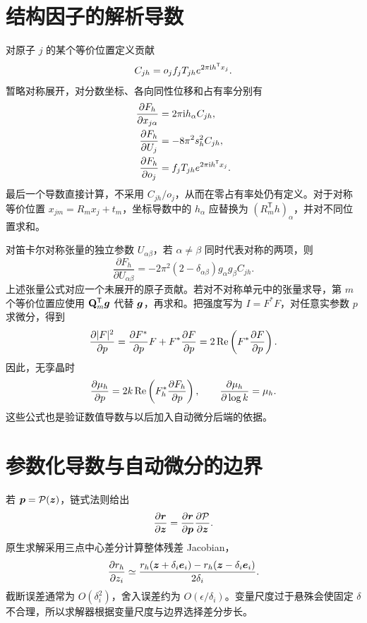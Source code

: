 \section{结构因子的解析导数}
对原子 $j$ 的某个等价位置定义贡献
\begin{equation}
C_{jh}=o_jf_jT_{jh}e^{2\pi\mathrm{i} h^{\mathsf T}x_j}.
\end{equation}
暂略对称展开，对分数坐标、各向同性位移和占有率分别有
\begin{align}
\frac{\partial F_h}{\partial x_{j\alpha}}&=2\pi\mathrm{i} h_\alpha C_{jh},\\
\frac{\partial F_h}{\partial U_j}&=-8\pi^2s_h^2C_{jh},\\
\frac{\partial F_h}{\partial o_j}&=f_jT_{jh}e^{2\pi\mathrm{i} h^{\mathsf T}x_j}.
\end{align}
最后一个导数直接计算，不采用 $C_{jh}/o_j$，从而在零占有率处仍有定义。对于对称等价位置 $x_{jm}=R_mx_j+t_m$，坐标导数中的 $h_\alpha$ 应替换为 $(R_m^{\mathsf T}h)_\alpha$，并对不同位置求和。

对笛卡尔对称张量的独立参数 $U_{\alpha\beta}$，若 $\alpha\ne\beta$ 同时代表对称的两项，则
\begin{equation}
\frac{\partial F_h}{\partial U_{\alpha\beta}}
=-2\pi^2(2-\delta_{\alpha\beta})g_\alpha g_\beta C_{jh}.
\end{equation}
上述张量公式对应一个未展开的原子贡献。若对不对称单元中的张量求导，第 $m$ 个等价位置应使用 $\mathbf{Q}_m^{\mathsf T}\bm{g}$ 代替 $\bm{g}$，再求和。把强度写为 $I=F^*F$，对任意实参数 $p$ 求微分，得到
\begin{equation}
\frac{\partial|F|^2}{\partial p}
=\frac{\partial F^*}{\partial p}F+F^*\frac{\partial F}{\partial p}
=2\operatorname{Re}\left(F^*\frac{\partial F}{\partial p}\right).
\label{eq:derivativeI}
\end{equation}
因此，无孪晶时
\begin{equation}
\frac{\partial\mu_h}{\partial p}
=2k\operatorname{Re}\left(F_h^*\frac{\partial F_h}{\partial p}\right),
\qquad
\frac{\partial\mu_h}{\partial\log k}=\mu_h.
\end{equation}
这些公式也是验证数值导数与以后加入自动微分后端的依据。

\section{参数化导数与自动微分的边界}
若 $\bm{p}=\mathcal P(\bm{z})$，链式法则给出
\begin{equation}
\frac{\partial\bm{r}}{\partial\bm{z}}
=\frac{\partial\bm{r}}{\partial\bm{p}}
\frac{\partial\mathcal P}{\partial\bm{z}}.
\end{equation}
原生求解采用三点中心差分计算整体残差 Jacobian，
\begin{equation}
\frac{\partial r_h}{\partial z_i}
\simeq\frac{r_h(\bm{z}+\delta_i\bm{e}_i)-r_h(\bm{z}-\delta_i\bm{e}_i)}{2\delta_i}.
\end{equation}
截断误差通常为 $O(\delta_i^2)$，舍入误差约为 $O(\epsilon/\delta_i)$。变量尺度过于悬殊会使固定 $\delta$ 不合理，所以求解器根据变量尺度与边界选择差分步长。

